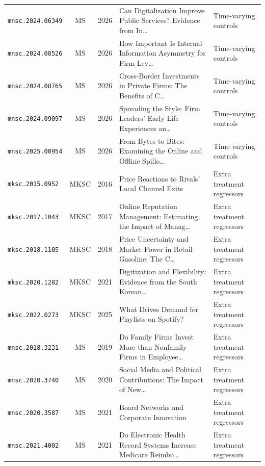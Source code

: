 \begin{longtable}{lccp{}l}
\texttt{mnsc.2024.06349} & MS & 2026 & \raggedright Can Digitalization Improve Public Services? Evidence from In\ldots{} & Time-varying controls \\
\texttt{mnsc.2024.08526} & MS & 2026 & \raggedright How Important Is Internal Information Asymmetry for Firm-Lev\ldots{} & Time-varying controls \\
\texttt{mnsc.2024.08765} & MS & 2026 & \raggedright Cross-Border Investments in Private Firms: The Benefits of C\ldots{} & Time-varying controls \\
\texttt{mnsc.2024.09097} & MS & 2026 & \raggedright Spreading the Style: Firm Leaders' Early Life Experiences an\ldots{} & Time-varying controls \\
\texttt{mnsc.2025.00954} & MS & 2026 & \raggedright From Bytes to Bites: Examining the Online and Offline Spillo\ldots{} & Time-varying controls \\
\texttt{mksc.2015.0952} & MKSC & 2016 & \raggedright Price Reactions to Rivals' Local Channel Exits & Extra treatment regressors \\
\texttt{mksc.2017.1043} & MKSC & 2017 & \raggedright Online Reputation Management: Estimating the Impact of Manag\ldots{} & Extra treatment regressors \\
\texttt{mksc.2018.1105} & MKSC & 2018 & \raggedright Price Uncertainty and Market Power in Retail Gasoline: The C\ldots{} & Extra treatment regressors \\
\texttt{mksc.2020.1282} & MKSC & 2021 & \raggedright Digitization and Flexibility: Evidence from the South Korean\ldots{} & Extra treatment regressors \\
\texttt{mksc.2022.0273} & MKSC & 2025 & \raggedright What Drives Demand for Playlists on Spotify? & Extra treatment regressors \\
\texttt{mnsc.2018.3231} & MS & 2019 & \raggedright Do Family Firms Invest More than Nonfamily Firms in Employee\ldots{} & Extra treatment regressors \\
\texttt{mnsc.2020.3740} & MS & 2020 & \raggedright Social Media and Political Contributions: The Impact of New\ldots{} & Extra treatment regressors \\
\texttt{mnsc.2020.3587} & MS & 2021 & \raggedright Board Networks and Corporate Innovation & Extra treatment regressors \\
\texttt{mnsc.2021.4002} & MS & 2021 & \raggedright Do Electronic Health Record Systems Increase Medicare Reimbu\ldots{} & Extra treatment regressors \\

\end{longtable}
